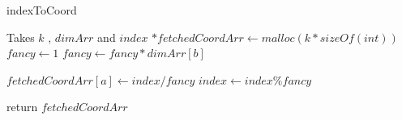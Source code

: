 \documentclass[twocolumn]{IEEEtran}
\begin{document}
\begin{algorithm}
	\caption{indexToCoord}
	\begin{algorithmic} 
		\STATE
		\STATE Takes $k$ , $dimArr$ and $index$
		\STATE
		\STATE $*fetchedCoordArr \leftarrow malloc(k*sizeOf(int))$
		\STATE $ fancy \leftarrow 1$
		\STATE $fancy \leftarrow fancy*dimArr[b]$
		
		\ENDFOR
		\STATE $fetchedCoordArr[a] \leftarrow index/fancy$ 
		\STATE $index \leftarrow index\%fancy$
		
		\ENDFOR		
		\STATE return $fetchedCoordArr$
		
	\end{algorithmic}
\end{algorithm}
\end{document}
